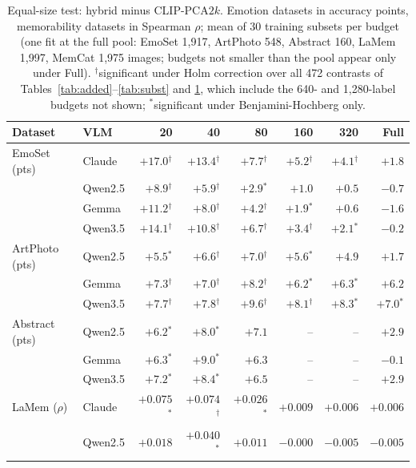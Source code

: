 \begin{table}[t]
\centering
\caption{Equal-size test: hybrid minus CLIP-PCA$2k$. Emotion datasets in accuracy points, memorability datasets in Spearman $\rho$; mean of 30 training subsets per budget (one fit at the full pool: EmoSet 1,917, ArtPhoto 548, Abstract 160, LaMem 1,997, MemCat 1,975 images; budgets not smaller than the pool appear only under Full). $^{\dagger}$significant under Holm correction over all 472 contrasts of Tables~\ref{tab:added}--\ref{tab:subst} and \ref{tab:equal}, which include the 640- and 1,280-label budgets not shown; $^{*}$significant under Benjamini-Hochberg only.}
\label{tab:equal}
\footnotesize
\setlength{\tabcolsep}{4pt}
\begin{tabular}{@{}llrrrrrr@{}}
\toprule
Dataset & VLM & 20 & 40 & 80 & 160 & 320 & Full \\
\midrule
EmoSet (pts) & Claude & $+17.0$$^{\dagger}$ & $+13.4$$^{\dagger}$ & $+7.7$$^{\dagger}$ & $+5.2$$^{\dagger}$ & $+4.1$$^{\dagger}$ & $+1.8$ \\
 & Qwen2.5 & $+8.9$$^{\dagger}$ & $+5.9$$^{\dagger}$ & $+2.9$$^{*}$ & $+1.0$ & $+0.5$ & $-0.7$ \\
 & Gemma & $+11.2$$^{\dagger}$ & $+8.0$$^{\dagger}$ & $+4.2$$^{\dagger}$ & $+1.9$$^{*}$ & $+0.6$ & $-1.6$ \\
 & Qwen3.5 & $+14.1$$^{\dagger}$ & $+10.8$$^{\dagger}$ & $+6.7$$^{\dagger}$ & $+3.4$$^{\dagger}$ & $+2.1$$^{*}$ & $-0.2$ \\
\addlinespace
ArtPhoto (pts) & Qwen2.5 & $+5.5$$^{*}$ & $+6.6$$^{\dagger}$ & $+7.0$$^{\dagger}$ & $+5.6$$^{*}$ & $+4.9$ & $+1.7$ \\
 & Gemma & $+7.3$$^{\dagger}$ & $+7.0$$^{\dagger}$ & $+8.2$$^{\dagger}$ & $+6.2$$^{*}$ & $+6.3$$^{*}$ & $+6.2$ \\
 & Qwen3.5 & $+7.7$$^{\dagger}$ & $+7.8$$^{\dagger}$ & $+9.6$$^{\dagger}$ & $+8.1$$^{\dagger}$ & $+8.3$$^{*}$ & $+7.0$$^{*}$ \\
\addlinespace
Abstract (pts) & Qwen2.5 & $+6.2$$^{*}$ & $+8.0$$^{*}$ & $+7.1$ & -- & -- & $+2.9$ \\
 & Gemma & $+6.3$$^{*}$ & $+9.0$$^{*}$ & $+6.3$ & -- & -- & $-0.1$ \\
 & Qwen3.5 & $+7.2$$^{*}$ & $+8.4$$^{*}$ & $+6.5$ & -- & -- & $+2.9$ \\
\addlinespace
LaMem ($\rho$) & Claude & $+0.075$$^{*}$ & $+0.074$$^{\dagger}$ & $+0.026$$^{*}$ & $+0.009$ & $+0.006$ & $+0.006$ \\
 & Qwen2.5 & $+0.018$ & $+0.040$$^{*}$ & $+0.011$ & $-0.000$ & $-0.005$ & $-0.005$ \\

\end{tabular}
\end{table}
